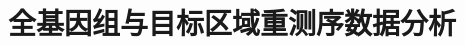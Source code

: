 \documentclass[]{beamer}
\title{全基因组与目标区域重测序数据分析}
\author{}
\institute{}
\date{}
\begin{document}
\maketitle
\begin{frame}
  
  \end{frame}
\end{document}
